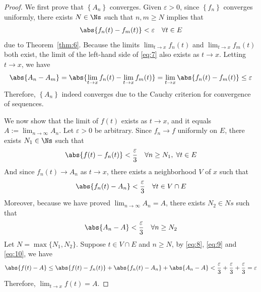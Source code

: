 \documentclass[thmcnt=section, 12pt]{elegantbook}
\begin{document}
\begin{proof}
    We first prove that $\left\{A_n\right\}$ converges. Given $\varepsilon > 0$, since $\left\{f_n\right\}$ converges uniformly, there exists $N \in \Ns$ such that $n, m \geq N$ implies that 
    \begin{align}
        \abs{f_n(t) - f_m(t)} < \varepsilon \quad 
        \forall t \in E
        \label{eq:7}
    \end{align}
    due to Theorem~\ref{thm:6}. Because the limits $\lim_{t \to x} f_n(t)$ and $\lim_{t \to x} f_m(t)$ both exist, the limit of the left-hand side of \eqref{eq:7} also exists as $t \to x$. Letting $t \to x$, we have
    \begin{align*}
        \abs{A_n - A_m}
        = \abs{\lim_{t \to x} f_n(t) - \lim_{t \to x} f_m(t)}
        = \lim_{t \to x} \abs{f_n(t) - f_m(t)} 
        \leq \varepsilon
    \end{align*}
    Therefore, $\left\{A_n\right\}$ indeed converges due to the Cauchy criterion for convergence of sequences.
    
    \par We now show that the limit of $f(t)$ exists as $t \to x$, and it equals $A := \lim_{n \to \infty} A_n$. Let $\varepsilon > 0$ be arbitrary. Since $f_n \to f$ uniformly on $E$, there exists $N_1 \in \Ns$ such that 
    \begin{align}
        \abs{f(t) - f_n(t)} < \frac{\varepsilon}{3} \quad \forall n \geq N_1, \; \forall t \in E
        \label{eq:8}
    \end{align}
    And since $f_n(t) \to A_n$ as $t \to x$, there exists a neighborhood $V$ of $x$ such that 
    \begin{align}
        \abs{f_n(t) - A_n} < \frac{\varepsilon}{3} \quad \forall t \in V \cap E
        \label{eq:9}
    \end{align}
    Moreover, because we have proved $\lim_{n \to \infty} A_n = A$, there exists $N_2 \in Ns$ such that
    \begin{align}
        \abs{A_n - A} < \frac{\varepsilon}{3} \quad \forall n \geq N_2
        \label{eq:10}
    \end{align}
    Let $N = \max\{N_1, N_2\}$. Suppose $t \in V \cap E$ and $n \geq N$, by \eqref{eq:8}, \eqref{eq:9} and \eqref{eq:10}, we have
    \begin{align*}
        \abs{f(t) - A}
        \leq \abs{f(t) - f_n(t)}
        + \abs{f_n(t) - A_n}
        + \abs{A_n - A} 
        < \frac{\varepsilon}{3} + \frac{\varepsilon}{3} + \frac{\varepsilon}{3}
        = \varepsilon
    \end{align*}
    Therefore, $\lim_{t \to x} f(t) = A$.
\end{proof}
\end{document}
